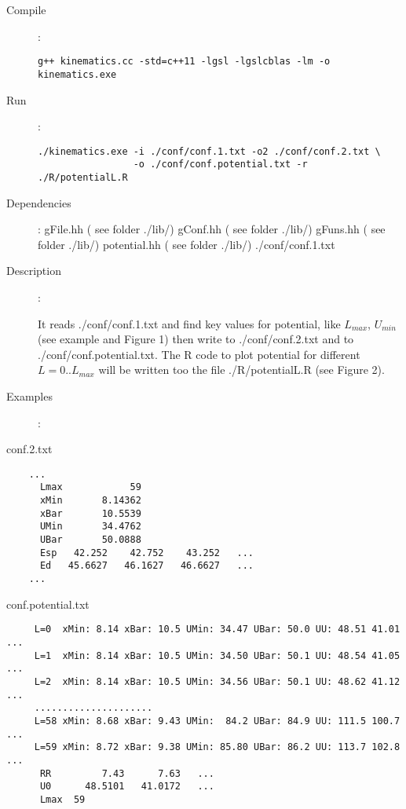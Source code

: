 \documentclass[preprint,review,12pt]{elsarticle}
\newcounter{bla}
\begin{document}
    \begin{description}
       \item[Compile]:  
        \begin{verbatim}
g++ kinematics.cc -std=c++11 -lgsl -lgslcblas -lm -o kinematics.exe
        \end{verbatim}
       \item[Run]:
        \begin{verbatim}
./kinematics.exe -i ./conf/conf.1.txt -o2 ./conf/conf.2.txt \
                 -o ./conf/conf.potential.txt -r ./R/potentialL.R
        \end{verbatim}
        
       \item [Dependencies]:
           \subitem   gFile.hh       ( see folder ./lib/)       
           \subitem   gConf.hh       ( see folder ./lib/)       
           \subitem   gFuns.hh       ( see folder ./lib/)       
           \subitem   potential.hh   ( see folder ./lib/)
           \subitem   ./conf/conf.1.txt

       \item [Description]:

           It reads ./conf/conf.1.txt and find key values for potential, like $L_{max}$, $U_{min}$ (see example and Figure 1) then write to 
           ./conf/conf.2.txt  and to  ./conf/conf.potential.txt. The R code to plot potential for different $L=0..L_{max}$ will be written too the file ./R/potentialL.R (see Figure 2). 




           
       \item [Examples]:
    \end{description}
    conf.2.txt
    \begin{verbatim}
    ...
      Lmax            59
      xMin       8.14362
      xBar       10.5539
      UMin       34.4762
      UBar       50.0888
      Esp   42.252    42.752    43.252   ...
      Ed   45.6627   46.1627   46.6627   ...
    ...
    \end{verbatim}  
    conf.potential.txt
    \begin{verbatim}
     L=0  xMin: 8.14 xBar: 10.5 UMin: 34.47 UBar: 50.0 UU: 48.51 41.01 ...
     L=1  xMin: 8.14 xBar: 10.5 UMin: 34.50 UBar: 50.1 UU: 48.54 41.05 ...
     L=2  xMin: 8.14 xBar: 10.5 UMin: 34.56 UBar: 50.1 UU: 48.62 41.12 ...
     .....................
     L=58 xMin: 8.68 xBar: 9.43 UMin:  84.2 UBar: 84.9 UU: 111.5 100.7 ...
     L=59 xMin: 8.72 xBar: 9.38 UMin: 85.80 UBar: 86.2 UU: 113.7 102.8 ...
      RR         7.43      7.63   ...
      U0      48.5101   41.0172   ...
      Lmax  59
    \end{verbatim}  
\end{document}
